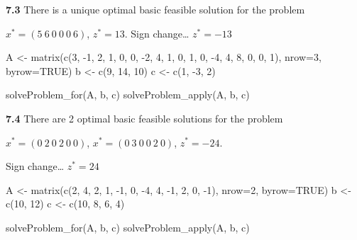 \documentclass[
]{article}
\newenvironment{Shaded}{\begin{snugshade}}{\end{snugshade}}
\newcommand{\AttributeTok}[1]{\textcolor[rgb]{0.77,0.63,0.00}{#1}}
\newcommand{\ConstantTok}[1]{\textcolor[rgb]{0.00,0.00,0.00}{#1}}
\newcommand{\DecValTok}[1]{\textcolor[rgb]{0.00,0.00,0.81}{#1}}
\newcommand{\FunctionTok}[1]{\textcolor[rgb]{0.00,0.00,0.00}{#1}}
\newcommand{\NormalTok}[1]{#1}
\newcommand{\OtherTok}[1]{\textcolor[rgb]{0.56,0.35,0.01}{#1}}
\newcommand{\SpecialCharTok}[1]{\textcolor[rgb]{0.00,0.00,0.00}{#1}}
\begin{document}
\textbf{7.3} There is a unique optimal basic feasible solution for the
problem

\(x^*= (5\ 6\ 0\ 0\ 0\ 6)\), \(z^*= 13\). Sign change\ldots{}
\(z^*= -13\)

\begin{Shaded}
\begin{Highlighting}[]
\NormalTok{A }\OtherTok{\textless{}{-}} \FunctionTok{matrix}\NormalTok{(}\FunctionTok{c}\NormalTok{(}\DecValTok{3}\NormalTok{, }\SpecialCharTok{{-}}\DecValTok{1}\NormalTok{, }\DecValTok{2}\NormalTok{, }\DecValTok{1}\NormalTok{, }\DecValTok{0}\NormalTok{, }\DecValTok{0}\NormalTok{, }\SpecialCharTok{{-}}\DecValTok{2}\NormalTok{, }\DecValTok{4}\NormalTok{, }\DecValTok{1}\NormalTok{, }\DecValTok{0}\NormalTok{, }\DecValTok{1}\NormalTok{, }\DecValTok{0}\NormalTok{, }\SpecialCharTok{{-}}\DecValTok{4}\NormalTok{, }\DecValTok{4}\NormalTok{, }\DecValTok{8}\NormalTok{, }\DecValTok{0}\NormalTok{, }\DecValTok{0}\NormalTok{, }\DecValTok{1}\NormalTok{), }\AttributeTok{nrow=}\DecValTok{3}\NormalTok{, }\AttributeTok{byrow=}\ConstantTok{TRUE}\NormalTok{)}
\NormalTok{b }\OtherTok{\textless{}{-}} \FunctionTok{c}\NormalTok{(}\DecValTok{9}\NormalTok{, }\DecValTok{14}\NormalTok{, }\DecValTok{10}\NormalTok{)}
\NormalTok{c }\OtherTok{\textless{}{-}} \FunctionTok{c}\NormalTok{(}\DecValTok{1}\NormalTok{, }\SpecialCharTok{{-}}\DecValTok{3}\NormalTok{, }\DecValTok{2}\NormalTok{)}

\FunctionTok{solveProblem\_for}\NormalTok{(A, b, c)}
\FunctionTok{solveProblem\_apply}\NormalTok{(A, b, c)}
\end{Highlighting}
\end{Shaded}

\textbf{7.4} There are 2 optimal basic feasible solutions for the
problem

\(x^*= (0\ 2\ 0\ 2\ 0\ 0)\), \(x^*= (0\ 3\ 0\ 0\ 2\ 0)\), \(z^*= -24\).

Sign change\ldots{} \(z^*= 24\)

\begin{Shaded}
\begin{Highlighting}[]
\NormalTok{A }\OtherTok{\textless{}{-}} \FunctionTok{matrix}\NormalTok{(}\FunctionTok{c}\NormalTok{(}\DecValTok{2}\NormalTok{, }\DecValTok{4}\NormalTok{, }\DecValTok{2}\NormalTok{, }\DecValTok{1}\NormalTok{, }\SpecialCharTok{{-}}\DecValTok{1}\NormalTok{, }\DecValTok{0}\NormalTok{, }\SpecialCharTok{{-}}\DecValTok{4}\NormalTok{, }\DecValTok{4}\NormalTok{, }\SpecialCharTok{{-}}\DecValTok{1}\NormalTok{, }\DecValTok{2}\NormalTok{, }\DecValTok{0}\NormalTok{, }\SpecialCharTok{{-}}\DecValTok{1}\NormalTok{), }\AttributeTok{nrow=}\DecValTok{2}\NormalTok{, }\AttributeTok{byrow=}\ConstantTok{TRUE}\NormalTok{)}
\NormalTok{b }\OtherTok{\textless{}{-}} \FunctionTok{c}\NormalTok{(}\DecValTok{10}\NormalTok{, }\DecValTok{12}\NormalTok{)}
\NormalTok{c }\OtherTok{\textless{}{-}} \FunctionTok{c}\NormalTok{(}\DecValTok{10}\NormalTok{, }\DecValTok{8}\NormalTok{, }\DecValTok{6}\NormalTok{, }\DecValTok{4}\NormalTok{)}

\FunctionTok{solveProblem\_for}\NormalTok{(A, b, c)}
\FunctionTok{solveProblem\_apply}\NormalTok{(A, b, c)}
\end{Highlighting}
\end{Shaded}
\end{document}
